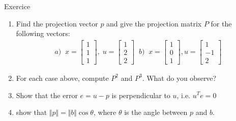 \begin{frame}{Exercice}
\begin{enumerate}
    \item Find the projection vector $p$ and give the projection matrix $P$ for the following vectors:
    \begin{align}
        a)\;\; x=\begin{bmatrix}
        1\\1\\1
    \end{bmatrix}, \;u=\begin{bmatrix}
        1\\2\\2
    \end{bmatrix}\;\; b) \;\;  x=\begin{bmatrix}
        1\\0\\1
    \end{bmatrix}, u=\begin{bmatrix}
        1\\-1\\2
    \end{bmatrix}
    \end{align}
    \item For each case above,  compute $P^2$ and $P^3$. What do you observe?
    \item  Show that the error $e=u-p$ is perpendicular  to $u$, i.e. $u^Te=0$
    \item show that $\Vert p \Vert = \Vert b \Vert \cos \theta$, where $\theta$ is the angle between $p$ and $b$.
\end{enumerate}
\end{frame}

